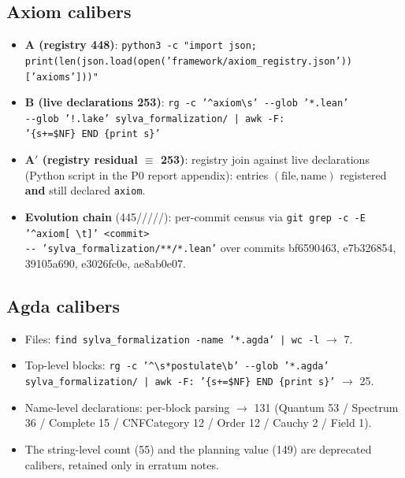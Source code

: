 \documentclass[11pt,a4paper]{article}
\begin{document}
\subsection{Axiom calibers}
\begin{itemize}\small
\item \textbf{A (registry 448)}:
\texttt{python3 -c "import json;}\\
\texttt{print(len(json.load(open('framework/axiom\_registry.json'))['axioms']))"}
\item \textbf{B (live declarations 253)}:
\texttt{rg -c '\^{}axiom\textbackslash s' -{}-glob '*.lean'}\\
\texttt{-{}-glob '!.lake' sylva\_formalization/ | awk -F:}\\
\texttt{'\{s+=\$NF\} END \{print s\}'}
\item \textbf{A$'$ (registry residual $\equiv$ 253)}: registry
join against live declarations (Python script in the P0 report
appendix): entries $(\text{file},\text{name})$ registered
\textbf{and} still declared \texttt{axiom}.
\item \textbf{Evolution chain}
(445/////):
per-commit census via
\texttt{git grep -c -E '\^{}axiom[ \textbackslash t]' <commit>}\\
\texttt{-{}- 'sylva\_formalization/**/*.lean'}
over commits bf6590463, e7b326854, 39105a690, e3026fc0e,
ae8ab0e07.
\end{itemize}

\subsection{Agda calibers}
\begin{itemize}\small
\item Files: \texttt{find sylva\_formalization -name '*.agda' | wc -l}
$\to$ 7.
\item Top-level blocks: \texttt{rg -c '\^{}\textbackslash s*postulate\textbackslash b' -{}-glob '*.agda'}\\
\texttt{sylva\_formalization/ | awk -F: '\{s+=\$NF\} END \{print s\}'}
$\to$ 25.
\item Name-level declarations: per-block parsing $\to$ 131
(Quantum 53 / Spectrum 36 / Complete 15 / CNFCategory 12 /
Order 12 / Cauchy 2 / Field 1).
\item The string-level count (55) and the planning value (149)
are deprecated calibers, retained only in erratum notes.
\end{itemize}
\end{document}
